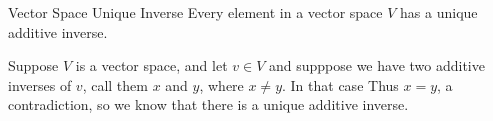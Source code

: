 \begin{theo*}{Vector Space Unique Inverse}
  Every element in a vector space $ V$ has a unique additive inverse.
  \begin{pf}
    Suppose $ V$ is a vector space, and let $  v \in V$ and supppose we have two additive inverses of $ v$, call them $ x$ and $ y$, where $ x \neq  y$. In that case
    Thus $ x =  y$, a contradiction, so we know that there is a unique additive inverse.
  \end{pf}
\end{theo*}
